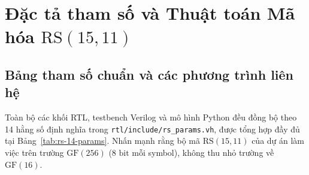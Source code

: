 \documentclass[12pt,a4paper]{report}
\begin{document}
\section{Đặc tả tham số và Thuật toán Mã hóa \texorpdfstring{$\text{RS}(15, 11)$}{RS(15, 11)}}

\subsection{Bảng tham số chuẩn và các phương trình liên hệ}

Toàn bộ các khối RTL, testbench Verilog và mô hình Python đều đồng bộ theo 14 hằng số định nghĩa trong \texttt{rtl/include/rs\_params.vh}, được tổng hợp đầy đủ tại Bảng~\ref{tab:rs-14-params}. Nhấn mạnh rằng bộ mã $\text{RS}(15,11)$ của dự án làm việc trên trường $\text{GF}(256)$ ($8\text{ bit}$ mỗi symbol), không thu nhỏ trường về $\text{GF}(16)$.
\end{document}
